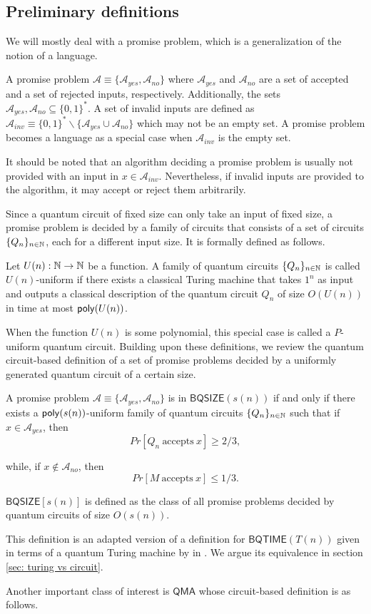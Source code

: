 \documentclass[11pt]{article}
\newcommand{\ms}[1]{\mathsf{#1}}
\begin{document}
\subsection{Preliminary definitions}
We will mostly deal with a promise problem, which is a generalization of the notion of a language.
\begin{definition}
     A promise problem $\mathcal{A} \equiv \{\mathcal{A}_{yes}, \mathcal{A}_{no}\}$ where $\mathcal{A}_{yes}$ and $\mathcal{A}_{no}$ are a set of accepted and a set of rejected inputs, respectively. Additionally, the sets $\mathcal{A}_{yes},\mathcal{A}_{no}\subseteq \{0,1\}^*$. A set of invalid inputs are defined as $ \mathcal{A}_{inv}\equiv \{0,1\}^*\backslash{} \{\mathcal{A}_{yes}\cup \mathcal{A}_{no}\}$ which may not be an empty set. A promise problem becomes a language as a special case when $\mathcal{A}_{inv}$ is the empty set.
\end{definition}
It should be noted that an algorithm deciding a promise problem is usually not provided with an input in $x\in \mathcal{A}_{inv}$. Nevertheless, if invalid inputs are provided to the algorithm, it may accept or reject them arbitrarily.
\par Since a quantum circuit of fixed size can only take an input of fixed size, a promise problem is decided by a family of circuits that consists of a set of circuits $\{Q_n\}_{n\in \mathbb{N}}$, each for a different input size. It is formally defined as follows.
\begin{definition}
     Let $U(n): \mathbb{N} \rightarrow \mathbb{N}$ be a function. A family of quantum circuits $\{Q_n\}_{n\in \mathbb{N}}$ is called $U(n)$-uniform if there exists a classical Turing machine that takes $1^{n}$ as input and outputs a classical description of the quantum circuit $Q_n$ of size $O(U(n))$ in time at most $\mathsf{poly}(U(n))$.
\end{definition}
When the function $U(n)$ is some polynomial, this special case is called a $P$-uniform quantum circuit. Building upon these definitions, we review the quantum circuit-based definition of a set of promise problems decided by a uniformly generated quantum circuit of a certain size.
\begin{definition}
    [$\ms{BQSIZE}(s(n))$] A promise problem $\mathcal{A} \equiv \{\mathcal{A}_{yes}, \mathcal{A}_{no}\}$ is in $\ms{BQSIZE}(s(n))$ if and only if there exists a $\mathsf{poly}(s(n))$-uniform family of quantum circuits $\{Q_n\}_{n\in \mathbb{N}}$ such that if $x\in \mathcal{A}_{yes}$, then   
    $${Pr[Q_n\ \textrm{accepts}\ x]\geq 2/3},$$
    
    while, if $x\not\in \mathcal{A}_{no}$, then 
    $${Pr[M\ \textrm{accepts}\ x]\leq 1/3}.$$
    
    $\ms{BQSIZE}[s(n)]$ is defined as the class of all promise problems decided by quantum circuits of size ${O(s(n))}$.
\end{definition}
This definition is an adapted version of a definition for $\ms{BQTIME}(T(n))$ given in terms of a quantum Turing machine by in \cite{fortnow2004promise}. We argue its equivalence in section \ref{sec: turing vs circuit}.\par
Another important class of interest is $\ms{QMA}$ whose circuit-based definition is as follows.
\end{document}
